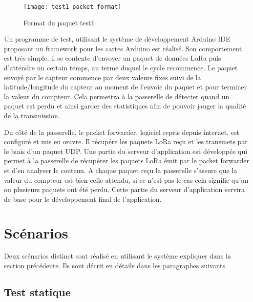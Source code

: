 \begin{figure}[htb]
\centering 
\texttt{[image: test1\_packet\_format]} 
\caption{Format du paquet test1}
\label{fig:test1_paquet}
\end{figure}

Un programme de test, utilisant le système de développement Arduino IDE proposant un framework pour les cartes Arduino est réalisé. Son comportement est très simple, il se contente d'envoyer un paquet de données LoRa puis d'attendre un certain temps, au terme duquel le cycle recommence. Le paquet envoyé par le capteur commence par deux valeurs fixes suivi de la latitude/longitude du capteur au moment de l'envoie du paquet et pour terminer la valeur du compteur. Cela permettra à la passerelle de détecter quand un paquet est perdu et ainsi garder des statistiques afin de pouvoir jauger la qualité de la transmission.

Du côté de la passerelle, le packet forwarder, logiciel repris depuis internet, est configuré et mis en œuvre. Il récupére les paquets LoRa reçu et les transmets par le biais d'un paquet UDP. Une partie du serveur d'application est développée qui permet à la passerelle de récupérer les paquets LoRa émit par le packet forwarder et d'en analyser le contenu. A chaque paquet reçu la passerelle s'assure que la valeur du compteur est bien celle attendu, si ce n'est pas le cas cela signifie qu'un ou plusieurs paquets ont été perdu. Cette partie du serveur d'application servira de base pour le développement final de l'application.

\section{Scénarios}

Deux scénarios distinct sont réalisé en utilisant le système expliquer dans la section précédente. Ils sont décrit en détails dans les paragraphes suivants.

\subsection{Test statique}





